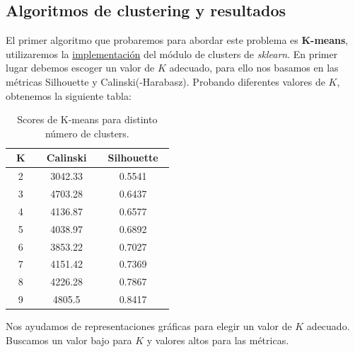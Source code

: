 \documentclass[oneside]{book}
\begin{document}
\subsection{Algoritmos de clustering y resultados}

El primer algoritmo que probaremos para abordar este problema es
\textbf{K-means}, utilizaremos la
\href{https://scikit-learn.org/stable/modules/generated/sklearn.cluster.KMeans.html}{implementación}
del módulo de clusters de \textit{sklearn}. En primer lugar debemos
escoger un valor de $K$ adecuado, para ello nos basamos en las
métricas Silhouette y Calinski(-Harabasz). Probando diferentes valores
de $K$, obtenemos la siguiente tabla:

\begin{table}[H]
  \centering
\begin{tabular}{|c|cc|}
  \hline
  ~\hspace{2mm}K\hspace{2mm}~ & ~\hspace{2mm}Calinski\hspace{2mm}~ & ~\hspace{2mm}Silhouette\hspace{2mm}~ \\ \hline
2 & 3042.33 & 0.5541 \\ \hline
3 & 4703.28 & 0.6437 \\ \hline
4 & 4136.87 & 0.6577 \\ \hline
5 & 4038.97 & 0.6892 \\ \hline
6 & 3853.22 & 0.7027 \\ \hline
7 & 4151.42 & 0.7369 \\ \hline
8 & 4226.28 & 0.7867 \\ \hline
9 & 4805.5 & 0.8417 \\ \hline
\end{tabular}
\caption{Scores de K-means para distinto número de clusters.}
\label{tab:k-means1}
\end{table}

Nos ayudamos de representaciones gráficas para elegir un valor de $K$
adecuado. Buscamos un valor bajo para $K$ y valores altos para las
métricas.
\end{document}
